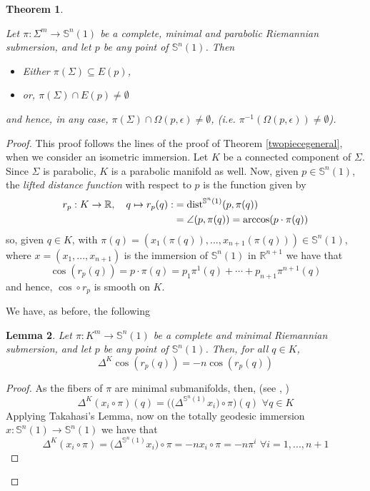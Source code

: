 \documentclass{amsart}
\newtheorem{theorem}{Theorem}[section]
\newtheorem{lemma}[theorem]{Lemma}
\theoremstyle{definition}
\theoremstyle{remark}
\newcommand{\erre}{\mathbb{R}}
\newcommand{\ese}{\mathbb{S}}
\begin{document}
\begin{theorem}\label{twopiecegeneralsub}

Let $\pi:\Sigma^m \to \mathbb{S}^n(1)$ be a complete, minimal and parabolic Riemannian submersion, and let $p$ be any point of $\mathbb{S}^n(1)$.  Then
    \begin{itemize}
        \item Either $\pi(\Sigma)\subseteq E(p)$, 
        \item or, $\pi(\Sigma)\cap E(p)\neq \emptyset$
            \end{itemize}
            and  hence, in any case,  $\pi(\Sigma) \cap \Omega(p,\epsilon) \neq \emptyset$, (i.e. $\pi^{-1}(\Omega(p,\epsilon))\neq \emptyset$).
\end{theorem}
\begin{proof}
This proof follows the lines of the proof of Theorem \ref{twopiecegeneral}, when we consider an isometric immersion. Let $K$ be a connected component of $\Sigma$. Since $\Sigma$ is parabolic, $K$ is a parabolic manifold as well.
Now, given $p\in \mathbb{S}^n(1)$, the \emph{lifted distance function} with respect to $p$ is the function given by
$$
\begin{aligned}
r_p:K \to \mathbb{R}, \quad q\mapsto r_p(q):&={\rm dist}^{\mathbb{S}^n(1)}(p,\pi(q))\\&=\angle{(p,\pi(q))}=\arccos(p\cdot \pi(q))
\end{aligned}
$$
so, given $q \in K$, with $\pi(q)=(x_1(\pi(q)),...,x_{n+1}(\pi(q))) \in \mathbb{S}^n(1)$, where $x=(x_1,...,x_{n+1})$ is the immersion of $\ese^n(1)$ in $\erre^{n+1}$ we have that
$$
\cos(r_p(q))=p\cdot \pi(q) = p_1\pi^1(q)+\cdots+p_{n+1}\pi^{n+1}(q)
$$
 and hence, $\cos\circ r_p$ is smooth on $K$. 
 
 We have, as before, the following
 
 \begin{lemma}\label{coslema2}
Let $\pi:K^m \to \mathbb{S}^n(1)$ be a complete and minimal Riemannian submersion, and let $p$ be any point of $\mathbb{S}^n(1)$. Then, for all $q \in K$,
 \begin{equation}\label{cos2}
\Delta^K \cos(r_p(q))=-n\cos(r_p(q))
\end{equation}
\end{lemma}
\begin{proof}
As the fibers of $\pi$ are minimal submanifolds, then, (see \cite{W}, \cite{GP})
$$\Delta^K(x_i\circ \pi)(q)=\bigg(\big(\Delta^{\ese^n(1)}x_i\big)\circ\pi\bigg)(q)\,\,\forall q \in K$$
  Applying Takahasi's Lemma, now on the totally geodesic immersion $x: \ese^n(1) \rightarrow \ese^n(1)$ we have that 
  $$\Delta^K (x_i\circ \pi)=\big(\Delta^{\ese^n(1)}x_i\big)\circ\pi=-n x_i\circ\pi=-n\pi^i\,\,\forall i=1,...,n+1$$
 

\end{proof}
\end{proof}
\end{document}
